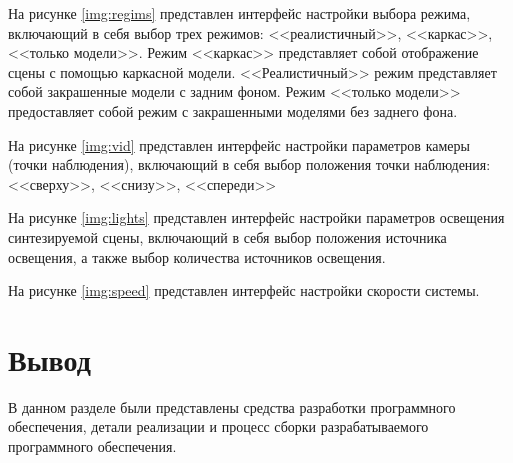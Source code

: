 
На рисунке \ref{img:regims} представлен интерфейс настройки выбора режима, включающий в себя выбор трех режимов: <<реалистичный>>, <<каркас>>, <<только модели>>. Режим <<каркас>> представляет собой отображение сцены с помощью каркасной модели. <<Реалистичный>> режим представляет собой закрашенные модели с задним фоном. Режим <<только модели>> предоставляет собой режим с закрашенными моделями без заднего фона.
\clearpage


На рисунке \ref{img:vid} представлен интерфейс настройки параметров камеры (точки наблюдения), включающий в себя выбор положения точки наблюдения: <<сверху>>, <<снизу>>, <<спереди>>

\clearpage
{}

На рисунке \ref{img:lights} представлен интерфейс настройки параметров освещения синтезируемой сцены, включающий в себя выбор положения источника освещения, а также выбор количества источников освещения. 

\clearpage
{}

На рисунке \ref{img:speed} представлен интерфейс настройки скорости системы.

\section{Вывод}

В данном разделе были представлены средства разработки программного обеспечения, детали реализации и процесс сборки разрабатываемого программного обеспечения. 